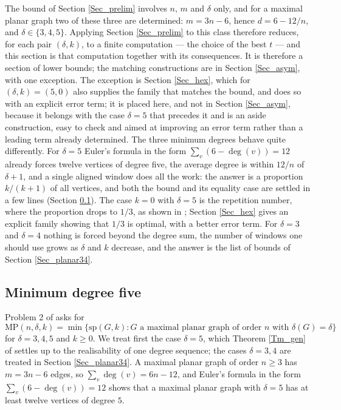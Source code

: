 \documentclass[12pt,a4paper]{article}%
\begin{document}
The bound of Section \ref{Sec_prelim} involves $n$, $m$ and $\delta $ only, and
for a maximal planar graph two of these three are determined: $m=3n-6$,
hence $d=6-12/n$, and $\delta \in \{3,4,5\}$. Applying Section \ref{Sec_prelim}
to this class therefore reduces, for each pair $(\delta ,k)$, to a finite
computation --- the choice of the best $t$ --- and this section is that
computation together with its consequences. It is therefore a section of lower bounds; the matching
constructions are in Section \ref{Sec_asym}, with one exception. The exception is Section \ref{Sec_hex},
which for $(\delta ,k)=(5,0)$ also supplies the family that matches the bound, and does so with an explicit
error term; it is placed here,
and not in Section \ref{Sec_asym}, because it belongs with the case $\delta =5$ that precedes it and
is an aside construction, easy to check and aimed at improving an error term rather than a leading term
already determined. The three minimum degrees behave quite differently. For $\delta =5$ Euler's formula in the form
$\sum_{v}(6-\deg (v))=12$ already forces twelve vertices of degree five, the
average degree is within $12/n$ of $\delta +1$, and a single aligned window does
all the work: the answer is a proportion $k/(k+1)$ of all vertices, and both the
bound and its equality case are settled in a few lines (Section
\ref{Sec_planar5}). The case $k=0$ with $\delta =5$ is the repetition number,
where the proportion drops to $1/3$, as shown in \cite{CaroWest}; Section \ref{Sec_hex} gives an explicit
family showing that $1/3$ is optimal, with a better error term. For $\delta =3$ and $\delta =4$ nothing
is forced beyond the degree sum, the number of windows one should use grows as
$\delta $ and $k$ decrease, and the answer is the list of bounds of Section
\ref{Sec_planar34}.



\subsection{Minimum degree five}
\label{Sec_planar5}

Problem 2 of \cite{CaroLauriZarb} asks for
\[
\mathrm{MP}(n,\delta ,k)=\min \{\mathrm{sp}(G,k):G\text{ a maximal planar graph of order }n%
\text{ with }\delta (G)=\delta \}
\]
for $\delta =3,4,5$ and $k\geq 0$. We treat first the case $\delta =5$, which Theorem
\ref{Tm_gen} of \cite{P1} settles up to the realisability of one degree sequence; the cases $\delta =3,4$ are
treated in Section \ref{Sec_planar34}. A maximal planar graph of
order $n\geq 3$ has $m=3n-6$ edges, so $\sum_{v}\deg (v)=6n-12$, and Euler's formula in the form
$\sum_{v}(6-\deg (v))=12$ shows that a maximal planar graph with $\delta =5$ has at least twelve
vertices of degree $5$.
\end{document}
